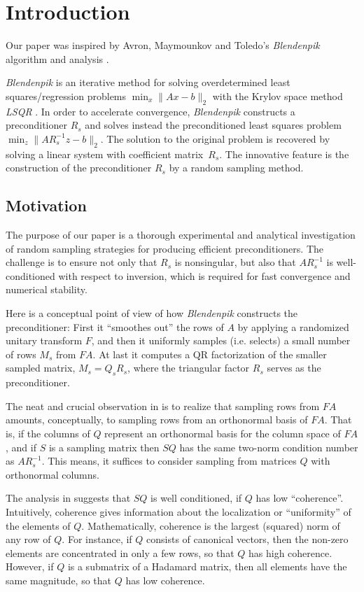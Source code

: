\documentclass{siamltex}
\begin{document}
\section{Introduction}
Our paper was inspired by Avron, Maymounkov and Toledo's
\textsl{Blendenpik} algorithm and analysis \cite{AMTol10}.

\textsl{Blendenpik} is an iterative method for solving overdetermined
least squares/regres\-sion problems $\min_x{\|Ax-b\|_2}$ with the Krylov
space method \textsl{LSQR} \cite{PS82}.  In order to accelerate
convergence, \textsl{Blendenpik} constructs a preconditioner $R_s$ and solves
instead the preconditioned least squares problem
$\min_z{\|AR_s^{-1}z-b\|_2}$. The solution to the original problem 
is recovered by solving a linear system with coefficient matrix~$R_s$.
The innovative feature is the construction of the preconditioner $R_s$
by a random sampling method. 

\subsection{Motivation}
The purpose of our paper is a thorough experimental and analytical
investigation of random sampling strategies for producing efficient
preconditioners.  The challenge is to ensure not only that $R_s$ is
nonsingular, but also that $AR_s^{-1}$ is well-conditioned with
respect to inversion, which is required for fast convergence and numerical 
stability.

Here is a conceptual point of view of how \textsl{Blendenpik}
constructs the preconditioner: First it ``smoothes out'' the rows of $A$ 
by applying a randomized unitary transform $F$, and then it uniformly samples
(i.e. selects) a small number of rows $M_s$ from $FA$. At last it
computes a QR factorization of the smaller sampled matrix,
$M_s=Q_sR_s$, where the triangular factor $R_s$ serves as the preconditioner.

The neat and crucial observation in \cite{AMTol10} is to realize that sampling
rows from $FA$ amounts, conceptually, to sampling rows from an
orthonormal basis of $FA$. That is, if the columns of $Q$ 
represent an orthonormal basis for the column space of $FA$,
and if $S$ is a sampling matrix then $SQ$ has the same
two-norm condition number as $AR_s^{-1}$.  This means, it suffices to
consider sampling from matrices $Q$ with orthonormal columns.

The analysis in \cite{AMTol10} suggests that 
$SQ$ is well conditioned, if $Q$ has low ``coherence''.  Intuitively,
coherence gives information about the localization
or ``uniformity'' of the elements of $Q$.  Mathematically,
coherence is the largest (squared) norm of any row of $Q$.
For instance, if $Q$ consists of canonical vectors, then the
non-zero elements are concentrated in only a few rows, so that $Q$
has high coherence.  However, if $Q$ is a submatrix of a Hadamard
matrix, then all elements have the same magnitude, so that $Q$
has low coherence.
\end{document}
